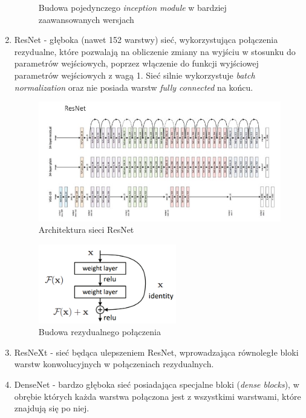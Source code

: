 \documentclass[polish,12pt]{aghthesis}
\begin{document}
\begin{enumerate}
\begin{figure}[ht]
        \caption{Budowa pojedynczego \textit{inception module} w bardziej zaawansowanych wersjach\cite{artSzegedyRet}}
        \label{fig:inception-module}
        \end{figure}
    \item ResNet - głęboka (nawet 152 warstwy)  sieć, wykorzystująca połączenia rezydualne, które pozwalają na obliczenie zmiany na wyjściu w stosunku do parametrów wejściowych, poprzez włączenie do funkcji wyjściowej parametrów wejściowych z wagą 1. Sieć silnie wykorzystuje \textit{batch normalization} oraz nie posiada warstw \textit{fully connected} na końcu.
        \begin{figure}[ht]
        \centering
        \includegraphics[width=16cm]{images/resnet.png}
        \caption{Architektura sieci ResNet\cite{artresnet}}
        \end{figure}
        \begin{figure}[ht]
        \centering
        \label{fig:resnet-architecture}
        \includegraphics[width=6cm]{images/residual_block.png}
        \caption{Budowa rezydualnego połączenia\cite{artresnet}}
        \label{fig:res-block}
        \end{figure}
    \item ResNeXt - sieć będąca ulepszeniem ResNet, wprowadzająca równoległe bloki warstw konwolucyjnych w połączeniach rezydualnych.
    \item DenseNet - bardzo głęboka sieć posiadająca specjalne bloki (\textit{dense blocks}), w obrębie których każda warstwa połączona jest z wszystkimi warstwami, które znajdują się po niej.
\end{enumerate}
\end{document}
